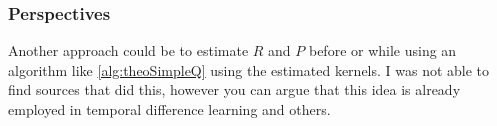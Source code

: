\subsubsection{Perspectives}
Another approach could be to 
estimate $R$ and $P$ before or while using an algorithm like
\cref{alg:theoSimpleQ} using the estimated kernels.
I was not able to find sources that
did this, however you can argue that this idea is already employed
in temporal difference learning and others.


